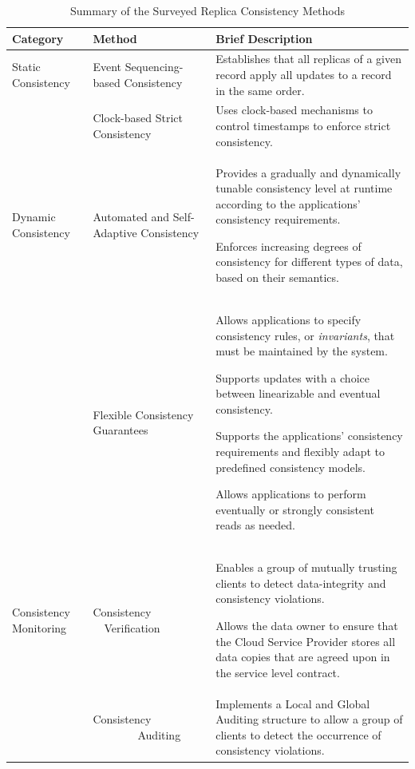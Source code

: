 \begin{table}[t]
	\setlength\extrarowheight{4pt}
	\centering
	\footnotesize{
		\caption{Summary of the Surveyed {\al Replica  Consistency} Methods}
		\vspace{1mm}
		\label{tab:surveyedMethods}
		\begin{tabular}{>{\raggedright\arraybackslash}p{2.0cm}>{\raggedright\arraybackslash}p{3.2cm}>{\raggedright\arraybackslash}p{10.5cm}}
			\hline
			Category   & Method    & Brief Description \\ \hline
			Static Consistency & Event Sequencing-based Consistency \cite{cooper2008pnuts} & Establishes that all replicas of a given record apply all updates to a record in the same order. \\                                                   
			& Clock-based Strict Consistency \cite{Corbett:2013, Du2013, salomie2015scaling} & Uses clock-based mechanisms to control timestamps to enforce strict consistency. \\ \hline
			
			Dynamic Consistency  & Automated and Self-Adapt\-ive Con\-sist\-en\-cy \cite{chihoub2012harmony, esteves2012quality, Terry:2013} & Provides a gradually and dynamically tunable consistency level at runtime according to the applications' consistency requirements. \par Enforces increasing degrees of consistency for different types of data, based on their semantics.\\
			& Flexible Consistency Guarantees \cite{balegas2015putting, BernsteinBBCFKK17, Chen:2014, sivasubramanian2012amazon} & Allows applications to specify consistency rules, or \textit{invariants}, that must be maintained by the system. \par {\rc Supports updates with a choice between linearizable and eventual consistency.} \par Supports the applications' consistency requirements and flexibly adapt to predefined consistency models. \par Allows applications to perform eventually or strongly consistent reads as needed.  \\ \hline
			
			Consistency Monitoring  & Consistency \ \ Verification \cite{BrandenburgerCK15, MukundanML12} & Enables a group of mutually trusting clients to detect data-integrity and consistency violations.  \par Allows the data owner to ensure that the Cloud Service Provider stores all data copies that are agreed upon in the service level contract.  \\
			& Consistency \ \ \ \ \ \ \ \ Auditing \cite{liu2014consistency} & Implements a Local and Global Auditing structure to allow a group of clients to detect the occurrence of consistency violations.    \\
			\hline
	\end{tabular}}
\end{table}

